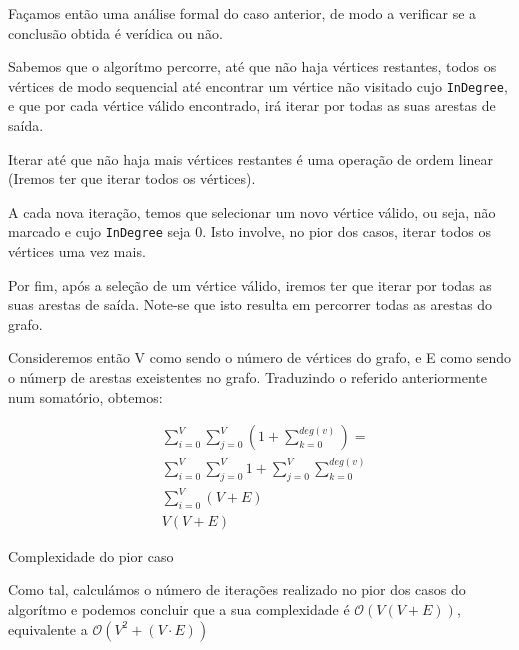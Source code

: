 Façamos então uma análise formal do caso anterior, de modo a
verificar se a conclusão obtida é verídica ou não.


Sabemos que o algorítmo percorre, até que não haja vértices
restantes, todos os vértices de modo
sequencial até encontrar um vértice não visitado cujo
\verb|InDegree|, e que por cada vértice válido encontrado, irá
iterar por todas as suas arestas de saída.

Iterar até que não haja mais vértices restantes é uma operação de
ordem linear (Iremos ter que iterar todos os vértices).

A cada nova iteração, temos que selecionar um novo vértice
válido, ou seja, não marcado e cujo \verb|InDegree| seja 0. Isto
involve, no pior dos casos, iterar todos os vértices uma vez
mais.

Por fim, após a seleção de um vértice válido, iremos ter que
iterar por todas as suas arestas de saída. Note-se que isto
resulta em percorrer todas as arestas do grafo.

Consideremos então V como sendo o número de vértices do grafo, e
E como sendo o númerp de arestas exeistentes no grafo. Traduzindo o referido anteriormente num somatório, obtemos:

\begin{listing}[H]
\begin{align}
  & \sum_{i = 0}^{V} \sum_{j=0}^{V} (1 + \sum_{k=0}^{deg(v)}) =
  \\
  & \sum_{i = 0}^{V} \sum_{j=0}^{V} 1 + \sum_{j=0}^{V}
  \sum_{k=0}^{deg(v)} \\
  & \sum_{i=0}^{V} (V + E) \\
  & V(V+E)
\end{align}
\caption{Complexidade do pior caso}
\end{listing}

Como tal, calculámos o número de iterações realizado no pior dos
casos do algorítmo e podemos concluir que a sua complexidade é
$\mathcal{O}(V(V+E))$, equivalente a $\mathcal{O}(V^2+(V \cdot
E))$
